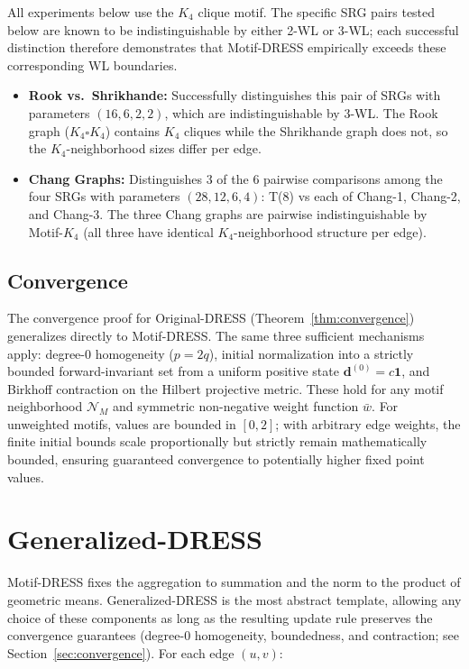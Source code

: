 \documentclass[11pt,a4paper]{article}
\begin{document}
All experiments below use the $K_4$ clique motif. The specific SRG pairs tested below are known to be indistinguishable by either 2-WL or 3-WL; each successful distinction therefore demonstrates that Motif-DRESS empirically exceeds these corresponding WL boundaries.
\begin{itemize}
    \item \textbf{Rook vs.\ Shrikhande:} Successfully distinguishes this pair of SRGs with parameters $(16, 6, 2, 2)$, which are indistinguishable by 3-WL. The Rook graph ($K_4 \square K_4$) contains $K_4$ cliques while the Shrikhande graph does not, so the $K_4$-neighborhood sizes differ per edge.
    \item \textbf{Chang Graphs:} Distinguishes 3 of the 6 pairwise comparisons among the four SRGs with parameters $(28, 12, 6, 4)$: T(8) vs each of Chang-1, Chang-2, and Chang-3. The three Chang graphs are pairwise indistinguishable by Motif-$K_4$ (all three have identical $K_4$-neighborhood structure per edge).
\end{itemize}

\subsection{Convergence}

The convergence proof for Original-DRESS (Theorem~\ref{thm:convergence}) generalizes directly to Motif-DRESS. The same three sufficient mechanisms apply: degree-0 homogeneity ($p = 2q$), initial normalization into a strictly bounded forward-invariant set from a uniform positive state $\mathbf{d}^{(0)} = c\mathbf{1}$, and Birkhoff contraction on the Hilbert projective metric. These hold for any motif neighborhood $\mathcal{N}_M$ and symmetric non-negative weight function $\bar{w}$. For unweighted motifs, values are bounded in $[0,2]$; with arbitrary edge weights, the finite initial bounds scale proportionally but strictly remain mathematically bounded, ensuring guaranteed convergence to potentially higher fixed point values.

\section{Generalized-DRESS}
Motif-DRESS fixes the aggregation to summation and the norm to the product of geometric means. Generalized-DRESS is the most abstract template, allowing any choice of these components as long as the resulting update rule preserves the convergence guarantees (degree-0 homogeneity, boundedness, and contraction; see Section~\ref{sec:convergence}). For each edge $(u,v)$:
\end{document}

